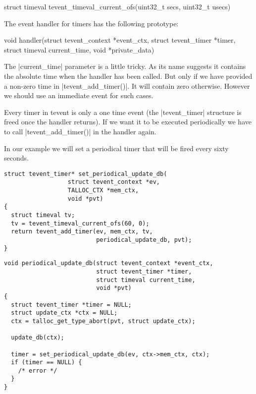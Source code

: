 \begin{funcproto}
struct timeval tevent_timeval_current_ofs(uint32_t secs,
                                          uint32_t usecs)
\end{funcproto}
\funclistend
The event handler for timers has the following prototype:

\begin{funcproto}
void handler(struct tevent_context *event_ctx,
             struct tevent_timer *timer,
             struct timeval current_time,
             void *private_data)
\end{funcproto}
\funclistend
The |current_time| parameter is a little tricky. As its name suggests it
contains the absolute time when the handler has been called. But only if we have
provided a non-zero time in |tevent_add_timer()|. It will contain zero
otherwise. However we should use an immediate event for such cases.

Every timer in tevent is only a one time event (the |tevent_timer| structure is
freed once the handler returns). If we want it to be executed periodically we
have to call |tevent_add_timer()| in the handler again.

In our example we will set a periodical timer that will be fired every sixty
seconds.

\begin{lstlisting}[morekeywords={tevent_add_timer},name=PeriodicalUpdateDB]
struct tevent_timer* set_periodical_update_db(
                  struct tevent_context *ev,
                  TALLOC_CTX *mem_ctx,
                  void *pvt)
{
  struct timeval tv;
  tv = tevent_timeval_current_ofs(60, 0);
  return tevent_add_timer(ev, mem_ctx, tv,
                          periodical_update_db, pvt);
}
\end{lstlisting}
\begin{lstlisting}[caption={Periodical update of a database},firstnumber=auto,
morekeywords={set_periodical_update_db},name=PeriodicalUpdateDB]
void periodical_update_db(struct tevent_context *event_ctx,
                          struct tevent_timer *timer,
                          struct timeval current_time,
                          void *pvt)
{
  struct tevent_timer *timer = NULL;
  struct update_ctx *ctx = NULL;
  ctx = talloc_get_type_abort(pvt, struct update_ctx);

  update_db(ctx);
  
  timer = set_periodical_update_db(ev, ctx->mem_ctx, ctx);
  if (timer == NULL) {
    /* error */
  }
}
\end{lstlisting}

